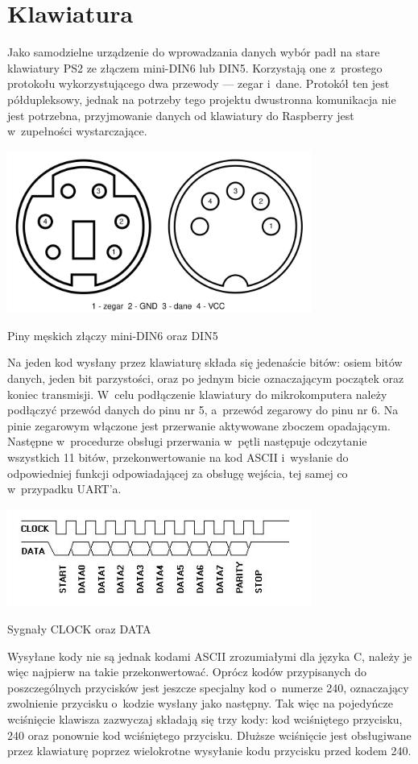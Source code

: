 \documentclass[shortabstract]{iithesis}
\begin{document}
\section{Klawiatura}
Jako samodzielne urządzenie do wprowadzania danych wybór padł na stare klawiatury PS2 ze złączem mini-DIN6 lub DIN5. Korzystają one z~prostego protokołu wykorzystującego dwa przewody --- zegar i~dane. Protokół ten jest półdupleksowy, jednak na potrzeby tego projektu dwustronna komunikacja nie jest potrzebna, przyjmowanie danych od klawiatury do Raspberry jest w~zupełności wystarczające.

\begingroup
\centering
\includegraphics[width=0.75\textwidth]{pinout.png}
\captionsetup{type=figure}
\caption{Piny męskich złączy mini-DIN6 oraz DIN5}
\endgroup

Na jeden kod wysłany przez klawiaturę składa się jedenaście bitów: osiem bitów danych, jeden bit parzystości, oraz po jednym bicie oznaczającym początek oraz koniec transmisji. W~celu podłączenie klawiatury do mikrokomputera należy podłączyć przewód danych do pinu nr 5, a~przewód zegarowy do pinu nr 6. Na pinie zegarowym włączone jest przerwanie aktywowane zboczem opadającym. Następne w~procedurze obsługi przerwania w~pętli następuje odczytanie wszystkich 11 bitów, przekonwertowanie na kod ASCII i~wysłanie do odpowiedniej funkcji odpowiadającej za obsługę wejścia, tej samej co w~przypadku UART'a.

\begingroup
\centering
\includegraphics[width=0.75\textwidth]{signals.png}
\captionsetup{type=figure}
\caption{Sygnały CLOCK oraz DATA}
\endgroup

Wysyłane kody nie są jednak kodami ASCII zrozumiałymi dla języka C, należy je więc najpierw na takie przekonwertować. Oprócz kodów przypisanych do poszczególnych przycisków jest jeszcze specjalny kod o~numerze 240, oznaczający zwolnienie przycisku o~kodzie wysłany jako następny. Tak więc na pojedyńcze wciśnięcie klawisza zazwyczaj składają się trzy kody: kod wciśniętego przycisku, 240 oraz ponownie kod wciśniętego przycisku. Dłuższe wciśnięcie jest obsługiwane przez klawiaturę poprzez wielokrotne wysyłanie kodu przycisku przed kodem 240.
\end{document}
